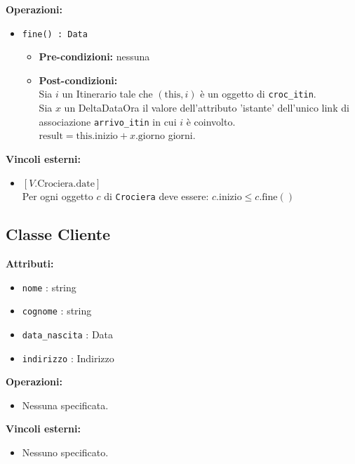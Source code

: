 \documentclass[a4paper]{scrartcl}
\begin{document}
\textbf{Operazioni:}
\begin{itemize}
    \item \texttt{fine() : Data}
    \begin{itemize}
        \item \textbf{Pre-condizioni:} nessuna
        \item \textbf{Post-condizioni:} \\
        Sia $i$ un Itinerario tale che $(\text{this}, i)$ è un oggetto di \texttt{croc\_itin}. \\
        Sia $x$ un DeltaDataOra il valore dell'attributo 'istante' dell'unico link di associazione \texttt{arrivo\_itin} in cui $i$ è coinvolto. \\
        $\text{result} = \text{this.inizio} + x.\text{giorno}$ giorni.
    \end{itemize}
\end{itemize}

\textbf{Vincoli esterni:}
\begin{itemize}
    \item $[V.\text{Crociera.date}]$ \\
    Per ogni oggetto $c$ di \texttt{Crociera} deve essere: $c.\text{inizio} \leq c.\text{fine}()$
\end{itemize}


\subsection{Classe Cliente}

\textbf{Attributi:}
\begin{itemize}
    \item \texttt{nome} : string
    \item \texttt{cognome} : string
    \item \texttt{data\_nascita} : Data
    \item \texttt{indirizzo} : Indirizzo
\end{itemize}

\textbf{Operazioni:}
\begin{itemize}
    \item Nessuna specificata.
\end{itemize}

\textbf{Vincoli esterni:}
\begin{itemize}
    \item Nessuno specificato.
\end{itemize}
\end{document}
